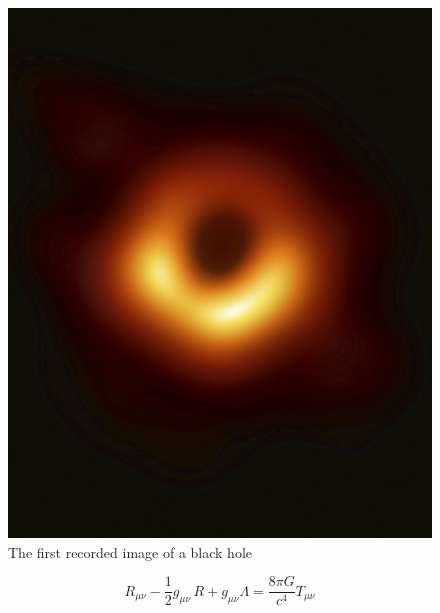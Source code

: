 \begin{figure}[H]
\centering    %
	\includegraphics[scale=0.10]{figures/blackhole.jpg}
	\captionsetup{justification=centering}
	\captionsetup{format=hang}
        \singlespace
	\caption{The first recorded image of a black hole}    %
\end{figure}

\begin{equation} \label{Equ.A.1}
R_{\mu \nu} - {\frac{1}{2}}g_{\mu \nu}\,R + g_{\mu \nu} \Lambda = 
 {\frac{8 \pi G}{c^4}} T_{\mu \nu}
\end{equation}